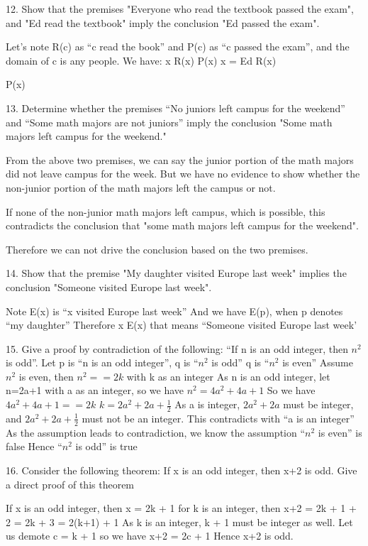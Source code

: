 \documentclass{article}
\begin{document}
12. Show that the premises "Everyone who read the textbook passed the exam", and "Ed read the textbook" imply the conclusion "Ed passed the exam".

Let's note R(c) as ``c read the book'' and P(c) as ``c passed the exam'', and the domain of c is any people.
We have:
\forall x R(x) \to P(x)
x = Ed
R(x)

\therefore P(x)

13. Determine whether the premises ``No juniors left campus for the weekend'' and ``Some math majors are not juniors'' imply the conclusion "Some math majors left campus for the weekend."

From the above two premises, we can say the junior portion of the math majors did not leave campus for the week. But we have no evidence to show whether the non-junior portion of the math majors left the campus or not.

If none of the non-junior math majors left campus, which is possible, this contradicts the conclusion that "some math majors left campus for the weekend". 

Therefore we can not drive the conclusion based on the two premises.

14. Show that the premise "My daughter visited Europe last week" implies the conclusion "Someone visited Europe last week".

Note E(x) is ``x visited Europe last week''
And we have E(p), when p denotes ``my daughter''
Therefore \exists x E(x) that means ``Someone visited Europe last week'

15. Give a proof by contradiction of the following: ``If n is an odd integer, then $n^2$ is odd''.
Let p is ``n is an odd integer'', q is ``$n^2$ is odd''
\lnot q is ``$n^2$ is even''
Assume $n^2$ is even, then $n^2 == 2k$ with k as an integer
As n is an odd integer, let n=2a+1 with a as an integer, so we have $n^2 = 4a^2 + 4a + 1$
So we have $4a^2 + 4a + 1 == 2k$
$k = 2a^2 + 2a + \frac{1}{2}$
As a is integer, $2a^2 + 2a$ must be integer, and $2a^2 + 2a + \frac{1}{2}$ must not be an integer.
This contradicts with ``a is an integer''
As the assumption leads to contradiction, we know the assumption ``$n^2$ is even'' is false
Hence ``$n^2$ is odd'' is true

16. Consider the following theorem: If x is an odd integer, then x+2 is odd. Give a direct proof of this theorem

If x is an odd integer, then x = 2k + 1 for k is an integer, then x+2 = 2k + 1 + 2 = 2k + 3 = 2(k+1) + 1
As k is an integer, k + 1 must be integer as well. Let us demote c = k + 1 so we have x+2 = 2c + 1
Hence x+2 is odd.
\end{document}
